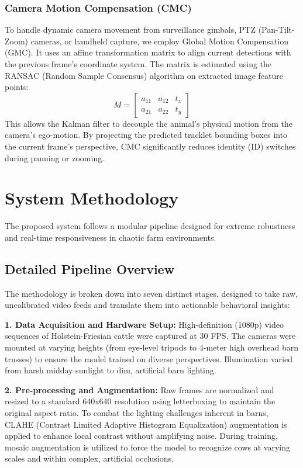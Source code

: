 \documentclass[conference]{IEEEtran}
\begin{document}
\subsubsection{Camera Motion Compensation (CMC)}
To handle dynamic camera movement from surveillance gimbals, PTZ (Pan-Tilt-Zoom) cameras, or handheld capture, we employ Global Motion Compensation (GMC). It uses an affine transformation matrix to align current detections with the previous frame's coordinate system. The matrix is estimated using the RANSAC (Random Sample Consensus) algorithm on extracted image feature points:
\begin{equation}
    M = \begin{bmatrix} a_{11} & a_{12} & t_x \\ a_{21} & a_{22} & t_y \end{bmatrix}
\end{equation}
This allows the Kalman filter to decouple the animal's physical motion from the camera's ego-motion. By projecting the predicted tracklet bounding boxes into the current frame's perspective, CMC significantly reduces identity (ID) switches during panning or zooming.

\section{System Methodology}
The proposed system follows a modular pipeline designed for extreme robustness and real-time responsiveness in chaotic farm environments. 

\subsection{Detailed Pipeline Overview}
The methodology is broken down into seven distinct stages, designed to take raw, uncalibrated video feeds and translate them into actionable behavioral insights:

\textbf{1. Data Acquisition and Hardware Setup:} High-definition (1080p) video sequences of Holstein-Friesian cattle were captured at 30 FPS. The cameras were mounted at varying heights (from eye-level tripods to 4-meter high overhead barn trusses) to ensure the model trained on diverse perspectives. Illumination varied from harsh midday sunlight to dim, artificial barn lighting.

\textbf{2. Pre-processing and Augmentation:} Raw frames are normalized and resized to a standard 640x640 resolution using letterboxing to maintain the original aspect ratio. To combat the lighting challenges inherent in barns, CLAHE (Contrast Limited Adaptive Histogram Equalization) augmentation is applied to enhance local contrast without amplifying noise. During training, mosaic augmentation is utilized to force the model to recognize cows at varying scales and within complex, artificial occlusions.
\end{document}
